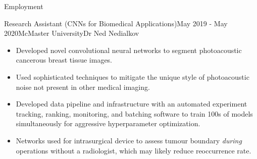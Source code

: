 \begin{rSection}{Employment}
\begin{rSubsection}{Research Assistant (CNNs for Biomedical Applications)}{May 2019 - May 2020}{McMaster University}{Dr Ned Nedialkov}
  \begin{itemize}
      \addtolength\itemsep{-0.5em}
    \item Developed novel convolutional neural networks to segment photoacoustic cancerous breast tissue images.
    \item Used sophisticated techniques to mitigate the unique style of photoacoustic noise not present in other medical imaging.
    \item Developed data pipeline and infrastructure with an automated experiment tracking, ranking, monitoring, and batching software to train 100s of models simultaneously for aggressive hyperparameter optimization.
    \item Networks used for intrasurgical device to assess tumour boundary \emph{during} operations without a radiologist, which may likely reduce reoccurrence rate.
  \end{itemize}
\end{rSubsection}



\end{rSection}